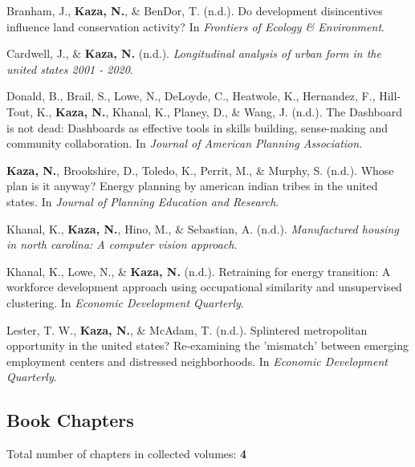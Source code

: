 \documentclass[11pt,a4paper,]{awesome-cv}
\newlength{\cslhangindent}
\newenvironment{CSLReferences}[2] %
 {\begin{list}{}{%
  \setlength{\itemindent}{0pt}
  \setlength{\leftmargin}{0pt}
  \setlength{\parsep}{0pt}
  \ifodd #1
   \setlength{\leftmargin}{\cslhangindent}
   \setlength{\itemindent}{-1\cslhangindent}
  \fi
  \setlength{\itemsep}{#2\baselineskip}}}
 {\end{list}}
\begin{document}
\label{refs-d651ca7bcf88858e75a3b62f6edc6bc1}
\begin{CSLReferences}{1}{0}
Branham, J., \textbf{Kaza, N.}, \& BenDor, T. (n.d.). Do development
disincentives influence land conservation activity? In \emph{Frontiers
of Ecology \& Environment}.

Cardwell, J., \& \textbf{Kaza, N.} (n.d.). \emph{Longitudinal analysis
of urban form in the united states 2001 - 2020}.

Donald, B., Brail, S., Lowe, N., DeLoyde, C., Heatwole, K., Hernandez,
F., Hill-Tout, K., \textbf{Kaza, N.}, Khanal, K., Planey, D., \& Wang,
J. (n.d.). The Dashboard is not dead: Dashboards as effective tools in
skills building, sense-making and community collaboration. In
\emph{Journal of American Planning Association}.

\textbf{Kaza, N.}, Brookshire, D., Toledo, K., Perrit, M., \& Murphy, S.
(n.d.). Whose plan is it anyway? Energy planning by american indian
tribes in the united states. In \emph{Journal of Planning Education and
Research}.

Khanal, K., \textbf{Kaza, N.}, Hino, M., \& Sebastian, A. (n.d.).
\emph{Manufactured housing in north carolina: A computer vision
approach}.

Khanal, K., Lowe, N., \& \textbf{Kaza, N.} (n.d.). Retraining for energy
transition: A workforce development approach using occupational
similarity and unsupervised clustering. In \emph{Economic Development
Quarterly}.

Lester, T. W., \textbf{Kaza, N.}, \& McAdam, T. (n.d.). Splintered
metropolitan opportunity in the united states? Re-examining the
'mismatch' between emerging employment centers and distressed
neighborhoods. In \emph{Economic Development Quarterly}.

\end{CSLReferences}

\subsection{Book Chapters}\label{book-chapters}

Total number of chapters in collected volumes: \textbf{4}
\end{document}
